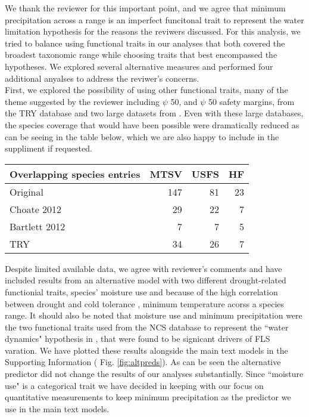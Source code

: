 \documentclass{article}[11pt]
\begin{document}
\noindent We thank the reviewer for this important point, and we agree that minimum precipitation across a range is an imperfect funcitonal trait to represent the water limitation hypothesis for the reasons the reviwers discussed. For this analysis, we tried to balance using functional traits in our analyses that both covered the broadest taxonomic range while choosing traits that best encompassed the hypotheses. We explored several alternative measures and performed four additional anyalses to address the reviwer's concerns.\\

\noindent First, we explored the possibility of using other functional traits, many of the theme suggested by the reviewer including $\psi$ 50, and $\psi$ 50 safety margins, from the TRY database and two large datasets from \citet{Bartlett2012} \citet{Choat2012}. Even with these large databases, the species coverage that would have been possible were dramatically reduced as can be seeing in the table below, which we are also happy to include in the suppliment if requested.\\

\begin{table}[ht]
\centering
\begin{tabular}{lrrr}
  \hline
  Overlapping species entries & MTSV & USFS & HF \\ 
  \hline
 Original & 147 &  81 &  23 \\ 
 Choate 2012 &  29 &  22 &   7 \\ 
 Bartlett 2012 &   7 &   7 &   5 \\ 
 TRY &  34 &  26 &   7 \\ 
   \hline
\end{tabular}
\end{table}

\noindent Despite limited available data, we agree with reviewer's comments and have included results from an alternative model with two different drought-related functionial traits, species' moisture use and because of the high correlation between drought and cold tolerance \citep{Zanne2013}, minimum temperature acorss a species range. It should also be noted that moisture use and minimum precipitation were the two functional traits used from the NCS database to represent the ``water dynamics" hypothesis in \citet{Gougherty2018}, that were found to be signicant drivers of FLS varation. We have plotted these results alongside the main text models in the Supporting Information ( Fig. \ref{fig:altpreds}). As can be seen the alternative predictor did not change the results of our analyses substantially. Since ``moisture use" is a categorical trait we have decided in keeping with our focus on quantitative measurements to keep minimum precipitation as the predictor we use in the main text models.  \\
\end{document}
